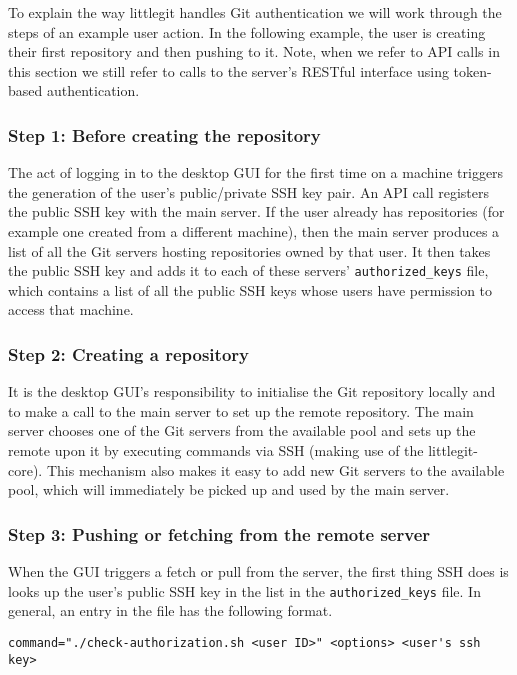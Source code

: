To explain the way littlegit handles Git authentication we will work through the steps of an example user action. In the following example, the user is creating their first repository and then pushing to it. Note, when we refer to API calls in this section we still refer to calls to the server's RESTful interface using token-based authentication.

\subsubsection{Step 1: Before creating the repository}

The act of logging in to the desktop GUI for the first time on a machine triggers the generation of the user's public/private SSH key pair. An API call registers the public SSH key with the main server. If the user already has repositories (for example one created from a different machine), then the main server produces a list of all the Git servers hosting repositories owned by that user. It then takes the public SSH key and adds it to each of these servers'  \texttt{authorized\_keys} file, which contains a list of all the public SSH keys whose users have permission to access that machine.

\subsubsection{Step 2: Creating a repository}
 
It is the desktop GUI's responsibility to initialise the Git repository locally and to make a call to the main server to set up the remote repository. The main server chooses one of the Git servers from the available pool and sets up the remote upon it by executing commands via SSH (making use of the littlegit-core). This mechanism also makes it easy to add new Git servers to the available pool, which will immediately be picked up and used by the main server.

\subsubsection{Step 3: Pushing or fetching from the remote server}

When the GUI triggers a fetch or pull from the server, the first thing SSH does is looks up the user's public SSH key in the list in the \texttt{authorized\_keys} file. In general, an entry in the file has the following format.

\begin{verbatim}
command="./check-authorization.sh <user ID>" <options> <user's ssh key>
\end{verbatim}

